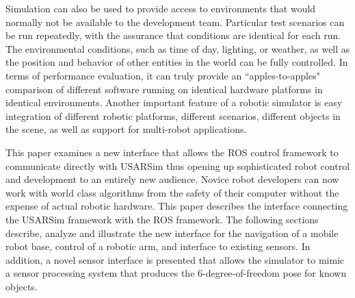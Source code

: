 Simulation can also be used to provide access to environments that would normally not be available to the development team. Particular test scenarios can be run repeatedly, with the assurance that conditions are identical for each run. The environmental conditions, such as time of day, lighting, or weather, as well as the position and behavior of other entities in the world can be fully controlled. In terms of performance evaluation, it can truly provide an ``apples-to-apples" comparison of different software running on identical hardware platforms in identical environments. Another important feature of a robotic simulator is easy integration of different robotic platforms, different scenarios, different objects in the scene, as well
as support for multi-robot applications.

This paper examines a new interface that allows the ROS control framework to communicate directly with USARSim thus opening up sophisticated robot control and development to an entirely new audience. Novice robot developers can now work with world class algorithms from the safety of their computer without the expense of actual robotic hardware.
This paper describes the interface connecting the USARSim framework with the ROS framework. The following sections describe, analyze and illustrate the new interface for the navigation of a mobile robot base, control of a robotic arm, and interface to existing sensors. In addition, a novel sensor interface is presented that allows the simulator to mimic a sensor processing system that produces the 6-degree-of-freedom pose for known objects.

